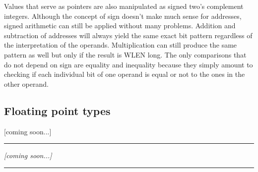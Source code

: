         Values that serve as pointers are also manipulated as signed two's complement integers. Although the concept of sign doesn't make much sense for addresses, signed arithmetic can still be applied without many problems. Addition and subtraction of addresses will always yield the same exact bit pattern regardless of the interpretation of the operands. Multiplication can still produce the same pattern as well but only if the result is WLEN long. The only comparisons that do not depend on sign are equality and inequality because they simply amount to checking if each individual bit of one operand is equal or not to the ones in the other operand.

    \subsection{Floating point types}

        [coming soon...]

    \par\noindent\rule{\textwidth}{0.4pt}
    \textit{[coming soon...]}
    \par\noindent\rule{\textwidth}{0.4pt}